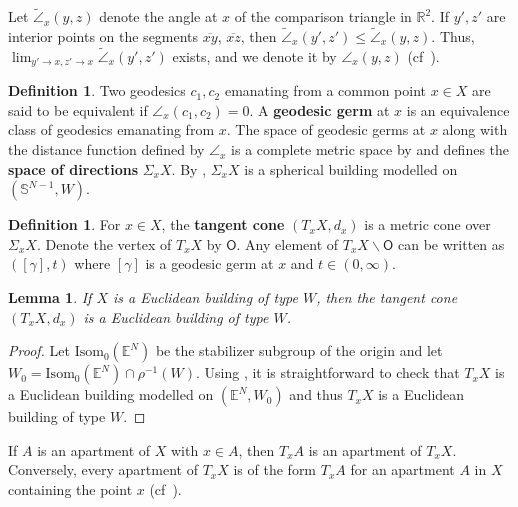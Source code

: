 \documentclass[12pt]{amsart}
\newtheorem{lemma}[theorem]{Lemma}
\theoremstyle{definition}
\newtheorem{definition}[theorem]{Definition}
\numberwithin{equation}{section}
\newcommand{\R}{\mathbb R}
\newcommand{\Sp}{\mathbb S}
\begin{document}
Let $\tilde \angle_x(y,z)$  denote the angle at $x$ of the
comparison triangle in $\R^2$. If $y', z'$ are interior points on the segments $\overline{xy}$, $\overline{xz}$,
then $\tilde \angle_x (y',z') \leq \tilde \angle_x(y,z)$. Thus, $\lim_{y' \rightarrow x, z' \rightarrow x}\tilde \angle_x(y',z')$ exists, and we denote it by $\angle_x(y,z)$ (cf~\cite[Section 2.1.3]{kleiner-leeb}).
\begin{definition} \label{geodesicgerms}
Two geodesics $c_1, c_2$ emanating from a common point $x\in X$ are said to be equivalent if  $\angle_x(c_1, c_2)=0$.  A {\bf geodesic germ} at $x$ is an equivalence class of geodesics emanating from $x$.  The space of geodesic germs at $x$ along with the distance function defined by $\angle_x$ is a complete metric space by \cite[Lemma 4.2.2]{kleiner-leeb} and defines  the {\bf space of directions} $\Sigma_xX$.  By \cite[Section 4.2.2]{kleiner-leeb}, $\Sigma_xX$ is a spherical building modelled on $(\Sp^{N-1}, W)$. 
\end{definition}



\begin{definition} \label{def:tangentcone}
For $x \in X$, the {\bf tangent cone} $(T_x X,d_x)$ is a metric cone over $\Sigma_x X$.  Denote the vertex of $T_{x} X$ by  $\mathsf{O}$.  Any element of $T_{x} X \backslash \mathsf{O}$ can be written as
$([\gamma], t)$
where $[\gamma]$ is a geodesic germ at $x$ and $t \in (0,\infty)$. 
\end{definition}


\begin{lemma}
If $X$ is a Euclidean building of type $W$, then the tangent cone $(T_xX,d_x)$ is a Euclidean building of type $W$.
\end{lemma}

\begin{proof}
Let $\mbox{Isom}_0(\mathbb E^N)$ be the stabilizer subgroup of the origin and let $W_0 = \mbox{Isom}_0(\mathbb E^N) \cap \rho^{-1}(W)$.  
Using  \cite[Lemma 4.2.3]{kleiner-leeb}, it is straightforward to check that $T_xX$ is a Euclidean building modelled on $(\mathbb E^N, W_0)$ and thus $T_xX$ is a Euclidean building of type $W$.
 \end{proof}

If $A$ is an apartment of $X$ with $x \in A$, then $T_xA$ is an apartment of $T_xX$.  Conversely, every apartment of $T_xX$ is of the form $T_xA$ for an apartment $A$ in $X$ containing the point $x$ (cf~\cite[Lemma 4.2.3]{kleiner-leeb}).  
\end{document}
